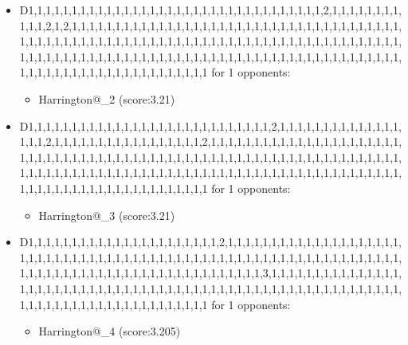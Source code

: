 \begin{appendices}
\begin{itemize}
        \item D1,1,1,1,1,1,1,1,1,1,1,1,1,1,1,1,1,1,1,1,1,1,1,1,1,1,1,1,1,1,1,1,1,1,2,1,1,1,1,1,1,1,1,1,1,1,2,1,2,1,1,1,1,1,1,1,1,1,1,1,1,1,1,1,1,1,1,1,1,1,1,1,1,1,1,1,1,1,1,1,1,1,1,1,1,1,1,1,1,1,1,1,1,1,1,1,1,1,1,1,1,1,1,1,1,1,1,1,1,1,1,1,1,1,1,1,1,1,1,1,1,1,1,1,1,1,1,1,1,1,1,1,1,1,1,1,1,1,1,1,1,1,1,1,1,1,1,1,1,1,1,1,1,1,1,1,1,1,1,1,1,1,1,1,1,1,1,1,1,1,1,1,1,1,1,1,1,1,1,1,1,1,1,1,1,1,1,1,1,1,1,1,1,1,1,1,1 for 1 opponents:
        \begin{multicols}{3}
            \begin{itemize}
                \item Harrington@\_2 (score:3.21)
            \end{itemize}
        \end{multicols}

        \item D1,1,1,1,1,1,1,1,1,1,1,1,1,1,1,1,1,1,1,1,1,1,1,1,1,1,1,1,2,1,1,1,1,1,1,1,1,1,1,1,1,1,1,1,1,1,2,1,1,1,1,1,1,1,1,1,1,1,1,1,1,1,1,1,2,1,1,1,1,1,1,1,1,1,1,1,1,1,1,1,1,1,1,1,1,1,1,1,1,1,1,1,1,1,1,1,1,1,1,1,1,1,1,1,1,1,1,1,1,1,1,1,1,1,1,1,1,1,1,1,1,1,1,1,1,1,1,1,1,1,1,1,1,1,1,1,1,1,1,1,1,1,1,1,1,1,1,1,1,1,1,1,1,1,1,1,1,1,1,1,1,1,1,1,1,1,1,1,1,1,1,1,1,1,1,1,1,1,1,1,1,1,1,1,1,1,1,1,1,1,1,1,1,1,1,1,1 for 1 opponents:
        \begin{multicols}{3}
            \begin{itemize}
                \item Harrington@\_3 (score:3.21)
            \end{itemize}
        \end{multicols}

        \item D1,1,1,1,1,1,1,1,1,1,1,1,1,1,1,1,1,1,1,1,1,1,2,1,1,1,1,1,1,1,1,1,1,1,1,1,1,1,1,1,1,1,1,1,1,1,1,1,1,1,1,1,1,1,1,1,1,1,1,1,1,1,1,1,1,1,1,1,1,1,1,1,1,1,1,1,1,1,1,1,1,1,1,1,1,1,1,1,1,1,1,1,1,1,1,1,1,1,1,1,1,1,1,1,1,1,1,1,1,1,1,1,1,1,1,3,1,1,1,1,1,1,1,1,1,1,1,1,1,1,1,1,1,1,1,1,1,1,1,1,1,1,1,1,1,1,1,1,1,1,1,1,1,1,1,1,1,1,1,1,1,1,1,1,1,1,1,1,1,1,1,1,1,1,1,1,1,1,1,1,1,1,1,1,1,1,1,1,1,1,1,1,1,1,1,1,1 for 1 opponents:
        \begin{multicols}{3}
            \begin{itemize}
                \item Harrington@\_4 (score:3.205)
            \end{itemize}
        \end{multicols}


\end{itemize}
\end{appendices}
